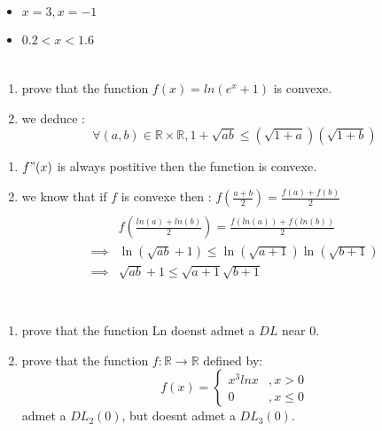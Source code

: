 \documentclass[12pt]{article}
\begin{document}
\begin{correctionbox}
	\begin{itemize}
		\item $x = 3, x = -1$
		\item $ 0.2 < x < 1.6   $
	\end{itemize}
\end{correctionbox}

\section{}
\begin{enumerate}
	\item prove that the function $f(x) = ln(e^x +1)$ is convexe.
	\item we deduce :
	      $$\forall (a,b) \in \mathbb{R}\times \mathbb{R}, 1 + \sqrt{ab}\le (\sqrt{1+a})(\sqrt{1+b})$$
\end{enumerate}

\begin{correctionbox}
	\begin{enumerate}
		\item $f"(x)$ is always postitive then the function is convexe.
		\item we know that if $f$ is convexe then : $ f\left(\frac{a+b}{2}\right) = \frac{f(a)+f(b)}{2}$ \\
		      \begin{align*}
			      \\
			               & f\left(\frac{ln(a) + ln(b)}{2}\right) = \frac{f(ln(a))+f(ln(b))}{2} \\
			      \implies & \ln(\sqrt{ab} + 1) \le \ln(\sqrt{a +1}) \ln(\sqrt{b+1})             \\
			      \implies & \sqrt{ab} + 1 \le \sqrt{a +1} \sqrt{b+1}                            \\
		      \end{align*}
	\end{enumerate}
\end{correctionbox}

\section{}
\begin{enumerate}
	\item prove that the function Ln doenst admet a $DL$ near 0.
	\item prove that the function $f: \mathbb{R} \to \mathbb{R}$ defined by:
	      $$
		      f(x)  =
		      \begin{cases}
			      x^3 ln x & ,x > 0   \\
			      0        & ,x \le 0
		      \end{cases}
	      $$ admet a $DL_2(0)$, but doesnt admet a $DL_3(0)$.
\end{enumerate}
\end{document}

